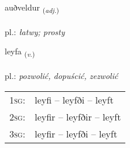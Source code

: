 \documentclass[frontgrid, backgrid]{flacards}\usepackage[]{graphicx}\usepackage[]{xcolor}
\begin{document}
\renewcommand{\flhead}{\vskip5pt \fboxsep=0pt {\small\bfseries\footnotesize Lýsingarorð | Adjective}}
\renewcommand{\fcfoot}{\vskip5pt \fboxsep=0pt \hspace{2pt}{\small\bfseries\footnotesize 1K}}

\renewcommand{\blhead}{\vskip5pt {\small\bfseries\footnotesize Lýsingarorð | Adjective }}
\renewcommand{\bcfoot}{\vskip5pt \hspace{2pt}{\small\bfseries\footnotesize 1K}}


{auðveldur \small{\textsubscript{(\textit{adj.})}} \\[1ex] %
\textphonetic{[œiðvɛltʏr]} \\
pl.: \emph{łatwy; prosty} \\  [2ex]
\renewcommand*{\arraystretch}{0.8}
}

\renewcommand{\flhead}{\vskip5pt \fboxsep=0pt {\small\bfseries\footnotesize Sagnorð | Verb}}
\renewcommand{\fcfoot}{\vskip5pt \fboxsep=0pt \hspace{2pt}{\small\bfseries\footnotesize 1K}}

\renewcommand{\blhead}{\vskip5pt {\small\bfseries\footnotesize Sagnorð | Verb }}
\renewcommand{\bcfoot}{\vskip5pt \hspace{2pt}{\small\bfseries\footnotesize 1K}}


{leyfa \small{\textsubscript{(\textit{v.})}} \\[1ex] %
\textphonetic{[leiːva]} \\
pl.: \emph{pozwolić, dopuścić, zezwolić} \\  [2ex]
\renewcommand*{\arraystretch}{0.8}
\begin{tabular}{p{1cm}l}
\textsc{1sg}: & leyfi -- leyfði -- leyft \\ 
\textsc{2sg}: & leyfir -- leyfðir -- leyft \\ 
\textsc{3sg}: & leyfir -- leyfði -- leyft \\ 
\end{tabular}
}
\end{document}
